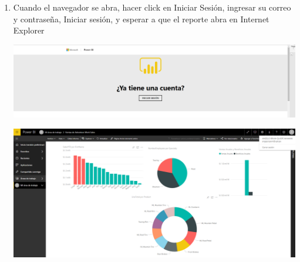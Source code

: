 \begin{itemize}
\begin{enumerate}
\item Cuando el navegador se abra, hacer click en Iniciar Sesión, ingresar su correo y contraseña, Iniciar sesión, y esperar a que el reporte abra en Internet Explorer
\begin{center}
\includegraphics[scale=0.30]{./Imagenes/27.png}
\end{center}
\begin{center}
\includegraphics[scale=0.30]{./Imagenes/28.png}
\end{center}



\end{enumerate}









\end{itemize}







